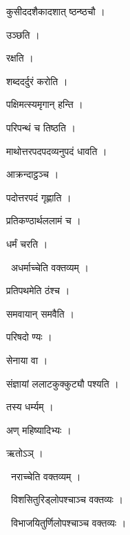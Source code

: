 \documentclass[10pt, openany, oneside]{book}
\begin{document}
\noindent कुसीददशैकादशात् ष्ठन्ष्ठचौ ।

\noindent उञ्छति ।

\noindent रक्षति ।

\noindent शब्ददर्दुरं करोति ।

\noindent पक्षिमत्स्यमृगान् हन्ति ।

\noindent परिपन्थं च तिष्ठति ।

\noindent माथोत्तरपदपदव्यनुपदं धावति ।

\noindent आक्रन्दाट्ठञ्च ।

\noindent पदोत्तरपदं गृह्णाति ।

\noindent प्रतिकण्ठार्थललामं च ।

\noindent धर्मं चरति ।

\par\noindent\hspace{1.5em}{\vps वा॰}~{\qt अधर्माच्चेति वक्तव्यम् ।}

\noindent प्रतिपथमेति ठंश्च ।

\noindent समवायान् समवैति ।

\noindent परिषदो ण्यः ।

\noindent सेनाया वा ।

\noindent संज्ञायां ललाटकुक्कुट्यौ पश्यति ।

\noindent तस्य धर्म्यम् ।

\noindent अण् महिष्यादिभ्यः ।

\noindent ऋतोऽञ् ।

\par\noindent\hspace{1.5em}{\vps वा॰}~{\qt नराच्चेति वक्तव्यम् ।}

\par\noindent\hspace{1.5em}{\vps वा॰}~{\qt विशसितुरिड्लोपश्चाञ्च वक्तव्यः ।}

\par\noindent\hspace{1.5em}{\vps वा॰}~{\qt विभाजयितुर्णिलोपश्चाञ्च वक्तव्यः ।}
\end{document}
